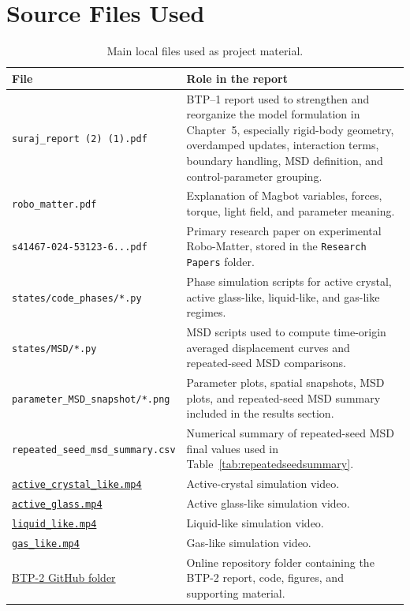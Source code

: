 \documentclass[12pt,a4paper,oneside]{report}
\newcommand{\btptwogithub}{https://github.com/suraj4556kumar-sketch/Robo_matter_duality/tree/main/BTP-2}
\begin{document}
\section{Source Files Used}
\begin{table}[H]
\centering
\caption{Main local files used as project material.}
\begin{tabularx}{\textwidth}{>{\raggedright\arraybackslash}p{6.7cm}X}
\toprule
File & Role in the report \\
\midrule
\texttt{suraj\_report (2) (1).pdf} & BTP--1 report used to strengthen and reorganize the model formulation in Chapter~5, especially rigid-body geometry, overdamped updates, interaction terms, boundary handling, MSD definition, and control-parameter grouping. \\
\texttt{robo\_matter.pdf} & Explanation of Magbot variables, forces, torque, light field, and parameter meaning. \\
\texttt{s41467-024-53123-6...pdf} & Primary research paper on experimental Robo-Matter, stored in the \texttt{Research Papers} folder. \\
\texttt{states/code\_phases/*.py} & Phase simulation scripts for active crystal, active glass-like, liquid-like, and gas-like regimes. \\
\texttt{states/MSD/*.py} & MSD scripts used to compute time-origin averaged displacement curves and repeated-seed MSD comparisons. \\
\texttt{parameter\_MSD\_snapshot/*.png} & Parameter plots, spatial snapshots, MSD plots, and repeated-seed MSD summary included in the results section. \\
\texttt{repeated\_seed\_msd\_summary.csv} & Numerical summary of repeated-seed MSD final values used in Table~\ref{tab:repeatedseedsummary}. \\
\href{\btptwogithub/states/simulation/active_crystal_like.mp4}{\texttt{active\_crystal\_like.mp4}} & Active-crystal simulation video. \\
\href{\btptwogithub/states/simulation/active_glass.mp4}{\texttt{active\_glass.mp4}} & Active glass-like simulation video. \\
\href{\btptwogithub/states/simulation/liquid_like.mp4}{\texttt{liquid\_like.mp4}} & Liquid-like simulation video. \\
\href{\btptwogithub/states/simulation/gas_like.mp4}{\texttt{gas\_like.mp4}} & Gas-like simulation video. \\
\href{\btptwogithub}{BTP-2 GitHub folder} & Online repository folder containing the BTP-2 report, code, figures, and supporting material. \\
\bottomrule
\end{tabularx}
\end{table}
\end{document}
